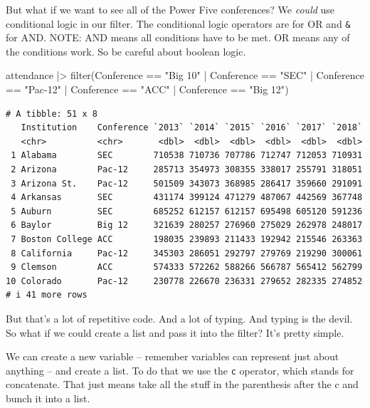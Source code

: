 \documentclass[
  letterpaper,
  DIV=11,
  numbers=noendperiod]{scrreprt}
\newenvironment{Shaded}{\begin{snugshade}}{\end{snugshade}}
\newcommand{\FunctionTok}[1]{\textcolor[rgb]{0.28,0.35,0.67}{#1}}
\newcommand{\NormalTok}[1]{\textcolor[rgb]{0.00,0.23,0.31}{#1}}
\newcommand{\SpecialCharTok}[1]{\textcolor[rgb]{0.37,0.37,0.37}{#1}}
\newcommand{\StringTok}[1]{\textcolor[rgb]{0.13,0.47,0.30}{#1}}
\begin{document}
But what if we want to see all of the Power Five conferences? We
\emph{could} use conditional logic in our filter. The conditional logic
operators are \texttt{\textbar{}} for OR and \texttt{\&} for AND. NOTE:
AND means all conditions have to be met. OR means any of the conditions
work. So be careful about boolean logic.

\begin{Shaded}
\begin{Highlighting}[]
\NormalTok{attendance }\SpecialCharTok{|\textgreater{}} \FunctionTok{filter}\NormalTok{(Conference }\SpecialCharTok{==} \StringTok{"Big 10"} \SpecialCharTok{|}\NormalTok{ Conference }\SpecialCharTok{==} \StringTok{"SEC"} \SpecialCharTok{|}\NormalTok{ Conference }\SpecialCharTok{==} \StringTok{"Pac{-}12"} \SpecialCharTok{|}\NormalTok{ Conference }\SpecialCharTok{==} \StringTok{"ACC"} \SpecialCharTok{|}\NormalTok{ Conference }\SpecialCharTok{==} \StringTok{"Big 12"}\NormalTok{)}
\end{Highlighting}
\end{Shaded}

\begin{verbatim}
# A tibble: 51 x 8
   Institution    Conference `2013` `2014` `2015` `2016` `2017` `2018`
   <chr>          <chr>       <dbl>  <dbl>  <dbl>  <dbl>  <dbl>  <dbl>
 1 Alabama        SEC        710538 710736 707786 712747 712053 710931
 2 Arizona        Pac-12     285713 354973 308355 338017 255791 318051
 3 Arizona St.    Pac-12     501509 343073 368985 286417 359660 291091
 4 Arkansas       SEC        431174 399124 471279 487067 442569 367748
 5 Auburn         SEC        685252 612157 612157 695498 605120 591236
 6 Baylor         Big 12     321639 280257 276960 275029 262978 248017
 7 Boston College ACC        198035 239893 211433 192942 215546 263363
 8 California     Pac-12     345303 286051 292797 279769 219290 300061
 9 Clemson        ACC        574333 572262 588266 566787 565412 562799
10 Colorado       Pac-12     230778 226670 236331 279652 282335 274852
# i 41 more rows
\end{verbatim}

But that's a lot of repetitive code. And a lot of typing. And typing is
the devil. So what if we could create a list and pass it into the
filter? It's pretty simple.

We can create a new variable -- remember variables can represent just
about anything -- and create a list. To do that we use the \texttt{c}
operator, which stands for concatenate. That just means take all the
stuff in the parenthesis after the c and bunch it into a list.
\end{document}
